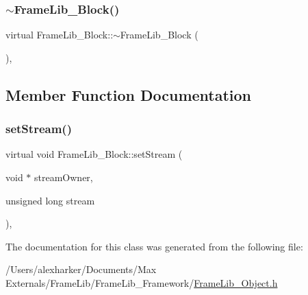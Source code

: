 \subsubsection{\texorpdfstring{$\sim$\+Frame\+Lib\+\_\+\+Block()}{~FrameLib\_Block()}}
{\footnotesize\ttfamily virtual Frame\+Lib\+\_\+\+Block\+::$\sim$\+Frame\+Lib\+\_\+\+Block (\begin{DoxyParamCaption}{ }\end{DoxyParamCaption})\hspace{0.3cm}{\ttfamily [inline]}, {\ttfamily [virtual]}}



\subsection{Member Function Documentation}
\mbox{\label{class_frame_lib___block_ac1e9dee6bc2b3f67cb6635d27797a0ea}} 
\subsubsection{\texorpdfstring{set\+Stream()}{setStream()}}
{\footnotesize\ttfamily virtual void Frame\+Lib\+\_\+\+Block\+::set\+Stream (\begin{DoxyParamCaption}\item[{void $\ast$}]{stream\+Owner,  }\item[{unsigned long}]{stream }\end{DoxyParamCaption})\hspace{0.3cm}{\ttfamily [inline]}, {\ttfamily [virtual]}}



The documentation for this class was generated from the following file\+:\begin{DoxyCompactItemize}
\item 
/\+Users/alexharker/\+Documents/\+Max Externals/\+Frame\+Lib/\+Frame\+Lib\+\_\+\+Framework/\hyperlink{_frame_lib___object_8h}{Frame\+Lib\+\_\+\+Object.\+h}\end{DoxyCompactItemize}
